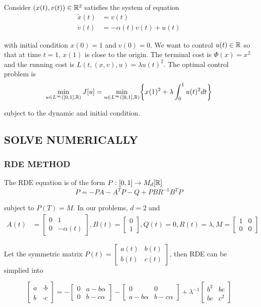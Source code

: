 Consider $(x(t), v(t)) \in \mathbb{R}^2$ satisfies the system of equation
\begin{align*}
	\dot{x}(t) &= v(t) \\
	\dot{v}(t) &= - \alpha(t) v(t) + u(t)
\end{align*}

with initial condition $x(0) = 1$ and $v(0) = 0$. We want to control $u(t) \in \mathbb{R}$ so that at time $t=1$, $x(1)$ is close to the origin. The terminal cost is $\Phi(x) = x^2$ and the running cost is $L(t, (x, v), u) = \lambda u(t)^2$. The optimal control problem is
$$
	\min_{u \in L^\infty([0, 1], \R)} J[u] = \min_{u \in L^\infty([0, 1], \R)} \set*{x(1)^2 + \lambda \int_0^1 u(t)^2 dt}
$$

subject to the dynamic and initial condition.

\subsection{SOLVE NUMERICALLY}

\subsubsection{RDE METHOD}

The RDE equation is of the form $P: [0, 1] \to M_d[\mathbb{R}]$
$$
	\dot{P} = - P A - A^T P - Q +  P B R^{-1} B^T P
$$

subject to $P(T) = M$. In our problems, $d = 2$ and
\begin{align*}
	A(t) &= \begin{bmatrix}
		0 & 1 \\
		0 & -\alpha(t)
	\end{bmatrix} , B(t) = \begin{bmatrix}
		0 \\
		1
	\end{bmatrix}, Q(t) = 0, R(t) = \lambda, M = \begin{bmatrix}
		1 & 0 \\
		0 & 0
	\end{bmatrix}
\end{align*}

Let the symmetric matrix $P(t) = \begin{bmatrix}
	a(t) & b(t) \\
	b(t) & c(t)
\end{bmatrix}$, then RDE can be simplied into 

$$
	\begin{bmatrix}
		\dot{a} & \cdot{b} \\
		\dot{b} & \cdot{c}
	\end{bmatrix} = - \begin{bmatrix}
		0 & a - b \alpha \\
		0 & b - c \alpha
	\end{bmatrix} - \begin{bmatrix}
		0 & 0 \\
		a - b \alpha & b - c \alpha
	\end{bmatrix} + \lambda^{-1} \begin{bmatrix}
		b^2 & bc \\
		bc & c^2
	\end{bmatrix}
$$

